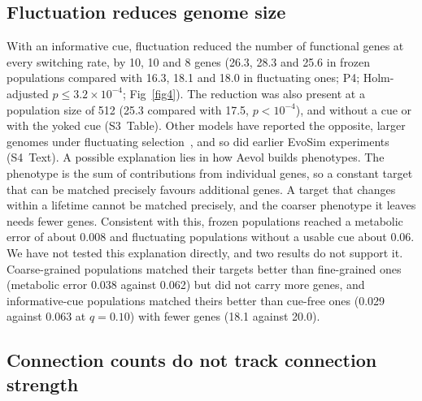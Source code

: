\documentclass[10pt,letterpaper]{article}
\begin{document}
\subsection*{Fluctuation reduces genome size}

With an informative cue, fluctuation reduced the number of functional genes at
every switching rate, by 10, 10 and 8 genes (26.3, 28.3 and 25.6 in frozen populations compared with 16.3,
18.1 and 18.0 in fluctuating ones; P4; Holm-adjusted $p\le 3.2\times10^{-4}$;
Fig~\ref{fig4}). The reduction was also present at a population size of 512 (25.3
compared with 17.5, $p<10^{-4}$), and without a cue or with the yoked cue
(S3~Table). Other models have reported the opposite, larger
genomes under fluctuating selection~\cite{tsuda2010,bentkowski2015}, and so did
earlier EvoSim experiments (S4~Text). A possible explanation lies in how Aevol
builds phenotypes. The phenotype is the sum of contributions from individual
genes, so a constant target that can be matched precisely favours additional genes. A target that changes within a lifetime cannot be matched precisely, and the coarser phenotype it leaves needs fewer genes. Consistent with this,
frozen populations reached a metabolic error of about 0.008 and fluctuating
populations without a usable cue about 0.06. We have not tested this explanation
directly, and two results do not support it. Coarse-grained populations matched
their targets better than fine-grained ones (metabolic error 0.038 against
0.062) but did not carry more genes, and informative-cue populations matched
theirs better than cue-free ones (0.029 against 0.063 at $q=0.10$) with fewer
genes (18.1 against 20.0).

\subsection*{Connection counts do not track connection strength}
\end{document}

